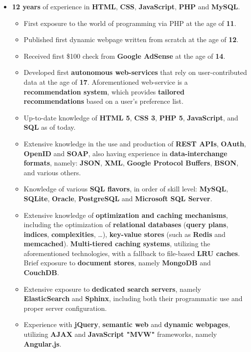 \documentclass[11pt,a4paper,sans]{moderncv}
\begin{document}
	\begin{itemize}
	\item	\label{webdev}  \textbf{12 years} of experience in \textbf{HTML}, \textbf{CSS}, \textbf{JavaScript}, \textbf{PHP} and \textbf{MySQL}.
		\begin{itemize}
		\item	First exposure to the world of programming via PHP at the age of \textbf{11}.
		\item	Published first dynamic webpage written from scratch at the age of \textbf{12}.
		\item	Received first \$100 check from \textbf{Google AdSense} at the age of \textbf{14}.
		\item	Developed first \textbf{autonomous web-services} that rely on user-contributed data at the age of \textbf{17}. Aforementioned web-service is a \textbf{recommendation system}, which provides \textbf{tailored recommendations} based on a user's preference list.
		\item	Up-to-date knowledge of \textbf{HTML 5}, \textbf{CSS 3}, \textbf{PHP 5}, \textbf{JavaScript}, and \textbf{SQL} as of today.
		\item	Extensive knowledge in the use and production of \textbf{REST APIs}, \textbf{OAuth}, \textbf{OpenID} and \textbf{SOAP}, also having experience in \textbf{data-interchange formats}, namely: \textbf{JSON}, \textbf{XML}, \textbf{Google Protocol Buffers}, \textbf{BSON}, and various others.
		\item	Knowledge of various \textbf{SQL flavors}, in order of skill level: \textbf{MySQL}, \textbf{SQLite}, \textbf{Oracle}, \textbf{PostgreSQL} and \textbf{Microsoft SQL Server}.
		\item	Extensive knowledge of \textbf{optimization and caching mechanisms}, including the optimization of \textbf{relational databases} (\textbf{query plans}, \textbf{indices}, \textbf{complexities}, \ldots), \textbf{key-value stores} (such as \textbf{Redis} and \textbf{memcached}). \textbf{Multi-tiered caching systems}, utilizing the aforementioned technologies, with a fallback to file-based \textbf{LRU caches}. Brief exposure to \textbf{document stores}, namely \textbf{MongoDB} and \textbf{CouchDB}.
		\item	Extensive exposure to \textbf{dedicated search servers}, namely \textbf{ElasticSearch} and \textbf{Sphinx}, including both their programmatic use and proper server configuration. 
		\item	Experience with \textbf{jQuery}, \textbf{semantic web} and \textbf{dynamic webpages}, utilizing \textbf{AJAX} and \textbf{JavaScript "MVW"} frameworks, namely \textbf{Angular.js}.

\end{itemize}
\end{itemize}
\end{document}
